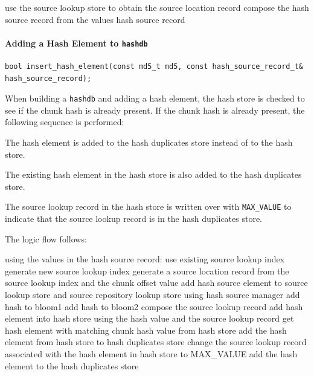 \documentclass[10pt,twoside]{article}
\newcommand{\hdb}{\texttt{hashdb}\xspace}
\begin{document}
\begin{algorithmic}
\STATE use the source lookup store to obtain the source location record
\STATE compose the hash source record from the values
\RETURN hash source record
\end{algorithmic}

\paragraph{Adding a Hash Element to \hdb}
\begin{small}
\begin{verbatim}
bool insert_hash_element(const md5_t md5, const hash_source_record_t& hash_source_record);
\end{verbatim}
\end{small}
When building a \hdb and adding a hash element,
the hash store is checked to see if the chunk hash is already present.
If the chunk hash is already present, the following sequence is performed:
\begin{compactitem}
\item The hash element is added to the hash duplicates store instead of to the hash store.
\item The existing hash element in the hash store is also added to the hash duplicates store.
\item The source lookup record in the hash store
is written over with \texttt{MAX\_VALUE}
to indicate that the source lookup record is in the hash duplicates store.
\end{compactitem}
The logic flow follows:
\begin{algorithmic}
\STATE using the values in the hash source record:
  \RETURN \FALSE
\ENDIF
{}
  \STATE use existing source lookup index
\ELSE
  \STATE generate new source lookup index
\ENDIF
\STATE generate a source location record from the source lookup index and the chunk offset value
\STATE add hash source element to source lookup store and source repository lookup store using hash source manager
  \STATE add hash to bloom1
\ENDIF
{}
  \STATE add hash to bloom2
\ENDIF
\STATE compose the source lookup record
  \STATE add hash element into hash store using the hash value and the source lookup record
\ELSE
  \STATE get hash element with matching chunk hash value from hash store
    \STATE add the hash element from hash store to hash duplicates store
    \STATE change the source lookup record associated with the hash element in hash store to MAX\_VALUE
  \ENDIF
  \STATE add the hash element to the hash duplicates store
\ENDIF
\end{algorithmic}
\end{document}
